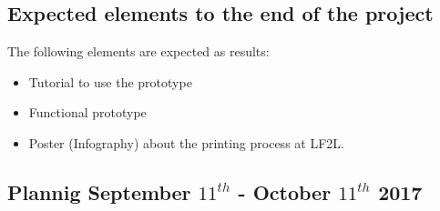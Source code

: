 \subsection{Expected elements to the end of the project}

The following elements are expected as results:

\begin{itemize}
	\item Tutorial to use the prototype
	\item Functional prototype
	\item Poster (Infography)  about the printing process at LF2L.
\end{itemize}


\newpage
\begin{landscape}
	
	\thispagestyle{empty}
	
	\subsection{Plannig September $11^{th}$ - October $11^{th}$ 2017}
	
	
\begin{adjustbox}{width={\linewidth}, keepaspectratio }


	
	\begin{gantt}{20}{25}
				
		\begin{ganttitle}
		\end{ganttitle}
		
		
		
		\begin{ganttitle}
			\numtitle{1}{1}{25}{1}
		\end{ganttitle}
		


		

\end{gantt}
\end{adjustbox}
\end{landscape}
